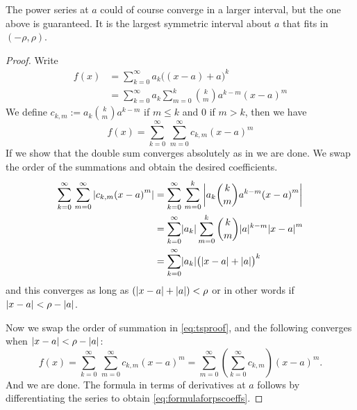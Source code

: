 The power series at $a$ could of course converge in a larger interval, but
the one above is guaranteed.  It is the largest symmetric interval about
$a$ that fits in $(-\rho,\rho)$.

\begin{proof}
Write
\begin{equation*}
\begin{split}
f(x) &= \sum_{k=0}^\infty a_k {\bigl((x-a)+a\bigr)}^k \\
&= \sum_{k=0}^\infty a_k \sum_{m=0}^k \binom{k}{m} a^{k-m} {(x-a)}^m %
\end{split}
\end{equation*}
We define $c_{k,m} := a_k \binom{k}{m} a^{k-m}$ if $m \leq k$ and $0$ if $m >
k$, then we have
\begin{equation} \label{eq:tsproof}
f(x) = \sum_{k=0}^\infty \, \sum_{m=0}^\infty c_{k,m} {(x-a)}^m
\end{equation}
If we show that the double sum converges absolutely as in  we
are done.  We swap the order of the summations and obtain the desired
coefficients.
\begin{equation*}
\begin{split}
\sum_{k=0}^\infty \, \sum_{m=0}^\infty \left\lvert { c_{k,m} {(x-a)}^m} \right\rvert
& = \sum_{k=0}^\infty \, \sum_{m=0}^k \left\lvert { a_k \binom{k}{m} a^{k-m} {(x-a)}^m } \right\rvert
\\
& = \sum_{k=0}^\infty \lvert {a_k} \rvert \sum_{m=0}^k \binom{k}{m} \lvert {a} \rvert^{k-m}
{\lvert {x-a} \rvert}^m  \\
& = \sum_{k=0}^\infty \lvert {a_k} \rvert {\bigl(\lvert {x-a} \rvert+\lvert {a} \rvert\bigr)}^k
\end{split}
\end{equation*}
and this converges as long as 
$(\lvert {x-a} \rvert+\lvert {a} \rvert) < \rho$ or in other words if
$\lvert {x-a} \rvert < \rho-\lvert {a} \rvert$.

Now we swap the order of summation in \eqref{eq:tsproof}, and 
the following converges when $\lvert {x-a} \rvert < \rho-\lvert {a} \rvert$:
\begin{equation*}
f(x) =
\sum_{k=0}^\infty \, \sum_{m=0}^\infty c_{k,m} {(x-a)}^m
=
\sum_{m=0}^\infty
\left( \sum_{k=0}^\infty
c_{k,m} \right) {(x-a)}^m .
\end{equation*}
And we are done.  The formula in terms of derivatives at $a$ follows by
differentiating the series to obtain \eqref{eq:formulaforpscoeffs}.
\end{proof}

